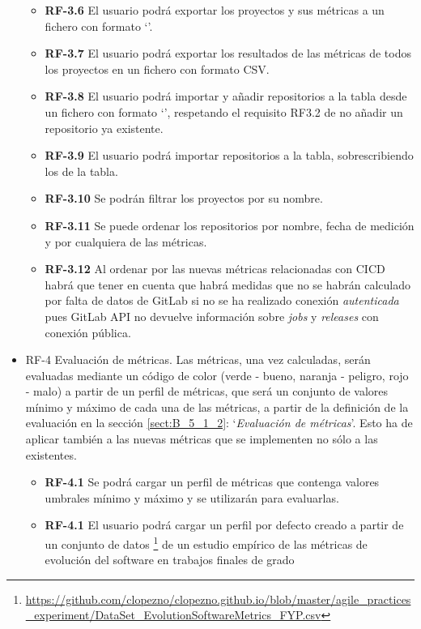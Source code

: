 \begin{itemize}
\begin{itemize}
		\item \textbf{RF-3.6} El usuario podrá exportar los proyectos y sus métricas a un fichero con formato `'.
		\item \textbf{RF-3.7} El usuario podrá exportar los resultados de las métricas de todos los proyectos en un fichero con formato CSV.
		\item \textbf{RF-3.8} El usuario podrá importar y añadir repositorios a la tabla  desde un fichero con formato `', respetando el requisito RF3.2 de no añadir un repositorio ya existente.
		\item \textbf{RF-3.9} El usuario podrá importar repositorios a la tabla, sobrescribiendo los de la tabla.
		\item \textbf{RF-3.10} Se podrán filtrar los proyectos por su nombre.
		\item \textbf{RF-3.11} Se puede ordenar los repositorios por nombre, fecha de medición y por cualquiera de las métricas.
		\item \textbf{RF-3.12} Al ordenar por las nuevas métricas relacionadas con CICD habrá que tener en cuenta que habrá medidas que no se habrán calculado por falta de datos de GitLab si no se ha realizado conexión \textit{autenticada} pues GitLab API no devuelve información  sobre \textit{jobs} y \textit{releases} con conexión pública.
	\end{itemize}
	\item RF-4 Evaluación de métricas. Las métricas, una vez calculadas, serán evaluadas mediante un código de color (verde - bueno, naranja - peligro, rojo - malo) a partir de un perfil de métricas, que será un conjunto de valores mínimo y máximo de cada una de las métricas, a partir de la definición de la evaluación en la sección \ref{sect:B_5_1_2}: `\textit{Evaluación de métricas}'. Esto ha de aplicar también a las nuevas métricas que se implementen no sólo a las existentes.
	\begin{itemize}
		\item \textbf{RF-4.1} Se podrá cargar un perfil de métricas que contenga valores umbrales mínimo y máximo y se utilizarán para evaluarlas.
		\item \textbf{RF-4.1} El usuario podrá cargar un perfil por defecto creado a partir de un conjunto de datos \footnote{\url{https://github.com/clopezno/clopezno.github.io/blob/master/agile_practices_experiment/DataSet_EvolutionSoftwareMetrics_FYP.csv}} de un estudio empírico de las métricas de evolución del software en trabajos finales de grado\cite{lopez_nozal_measuring_2019}

\end{itemize}
\end{itemize}
